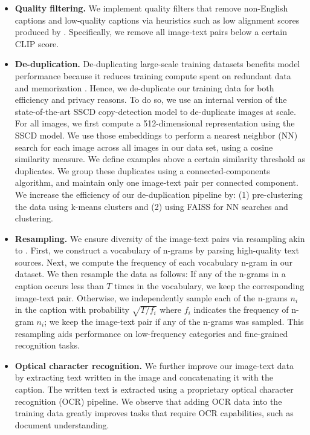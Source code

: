 \begin{itemize}

\item \textbf{Quality filtering.} We implement quality filters that remove non-English captions and low-quality captions via heuristics such as low alignment scores produced by \citep{radford2021learning}. Specifically, we remove all image-text pairs below a certain CLIP score.

\item \textbf{De-duplication.} De-duplicating large-scale training datasets benefits model performance because it reduces training compute spent on redundant data \citep{esser2024scaling,lee2021deduplicating,abbas2023semdedup} and memorization \citep{carlini2023extracting,somepalli2023diffusion}. Hence, we de-duplicate our training data for both efficiency and privacy reasons. To do so, we use an internal version of the state-of-the-art SSCD copy-detection model \citep{pizzi2022self} to de-duplicate images at scale. For all images, we first compute a 512-dimensional representation using the SSCD model. We use those embeddings to perform a nearest neighbor (NN) search for each image across all images in our data set, using a cosine similarity measure. We define examples above a certain similarity threshold as duplicates. We group these duplicates using a connected-components algorithm, and maintain only one image-text pair per connected component. We increase the efficiency of our de-duplication pipeline by: (1) pre-clustering the data using k-means clusters and (2) using FAISS \citep{johnson2019billion} for NN searches and clustering.

\item \textbf{Resampling.} We ensure diversity of the image-text pairs via resampling akin to \citet{xu2023demystifying,Mahajan_2018_ECCV,mikolov2013efficient}.
First, we construct a vocabulary of n-grams by parsing high-quality text sources. Next, we compute the frequency of each vocabulary n-gram in our dataset. We then resample the data as follows: If any of the n-grams in a caption occurs less than $T$ times in the vocabulary, we keep the corresponding image-text pair. Otherwise, we independently sample each of the n-grams $n_i$ in the caption with probability $\sqrt{T / f_i}$ where $f_i$ indicates the frequency of n-gram $n_i$; we keep the image-text pair if any of the n-grams was sampled. This resampling aids performance on low-frequency categories and fine-grained recognition tasks.

\item \textbf{Optical character recognition.} We further improve our image-text data by extracting text written in the image and concatenating it with the caption. The written text is extracted using a proprietary optical character recognition (OCR) pipeline. We observe that adding OCR data into the training data greatly improves tasks that require OCR capabilities, such as document understanding.

\end{itemize}

